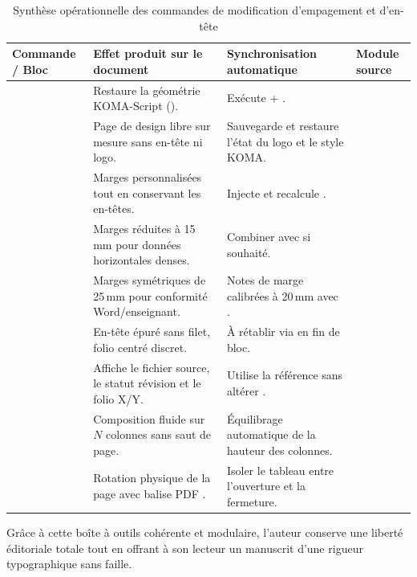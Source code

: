 \begin{table}[htbp]
  \centering
  \small
  \caption[Synthèse opérationnelle des commandes de géométrie et d'en-tête]{Synthèse opérationnelle des commandes de modification d'empagement et d'en-tête}
  \label{tab:checklist-geometries}
  \begin{tabularx}{\linewidth}{@{} >{\raggedright\arraybackslash}p{3.6cm} Y Y >{\raggedright\arraybackslash}p{2.7cm} @{}}
    \toprule
    \textbf{Commande / Bloc} & \textbf{Effet produit sur le document} & \textbf{Synchronisation automatique} & \textbf{Module source} \\
    \midrule
     &
    Restaure la géométrie KOMA-Script (). &
    Exécute  + . &
     \\
    \addlinespace
     &
    Page de design libre sur mesure sans en-tête ni logo. &
    Sauvegarde et restaure l'état du logo et le style KOMA. &
     \\
    \addlinespace
     &
    Marges personnalisées tout en conservant les en-têtes. &
    Injecte  et recalcule . &
     \\
    \addlinespace
     &
    Marges réduites à 15\,mm pour données horizontales denses. &
    Combiner avec  si souhaité. &
     \\
    \addlinespace
     &
    Marges symétriques de 25\,mm pour conformité Word/enseignant. &
    Notes de marge calibrées à 20\,mm avec . &
     \\
    \addlinespace
    \allowbreak{} &
    En-tête épuré sans filet, folio centré discret. &
    À rétablir via \allowbreak{} en fin de bloc. &
     \\
    \addlinespace
    \allowbreak{} &
    Affiche le fichier source, le statut révision et le folio X/Y. &
    Utilise la référence  sans altérer . &
     \\
    \addlinespace
     &
    Composition fluide sur $N$ colonnes sans saut de page. &
    Équilibrage automatique de la hauteur des colonnes. &
     \\
    \addlinespace
     &
    Rotation physique de la page avec balise PDF . &
    Isoler le tableau entre l'ouverture et la fermeture. &
     \\
    \bottomrule
  \end{tabularx}
\end{table}

Grâce à cette boîte à outils cohérente et modulaire,
l'auteur conserve une liberté éditoriale totale
tout en offrant à son lecteur un manuscrit d'une rigueur typographique sans faille.
